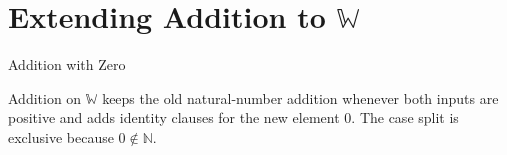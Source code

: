 
\section{Extending Addition to \texorpdfstring{$\mathbb{W}$}{W}}
\label{sec:extending-addition-to-w}
\begin{topicbox}{Addition with Zero}
\begin{exposition}
Addition on $\mathbb{W}$ keeps the old natural-number addition whenever both
inputs are positive and adds identity clauses for the new element $0$. The
case split is exclusive because $0\notin\mathbb{N}$.
\end{exposition}
\end{topicbox}
